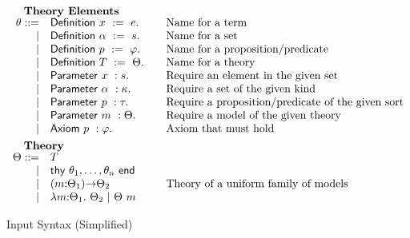 \begin{figure}
\[\begin{array}{rl@{\qquad}l}
		\noalign{\textbf{Theory Elements}}
		\ite ::=
		     & \iDefinition{\ix}{\ie}&\mbox{Name for a term}\\
		   | & \iDefinition{\iS}{\is}&\mbox{Name for a set}\\
		   | & \iDefinition{\iP}{\ip}&\mbox{Name for a proposition/predicate}\\
		   | & \iDefinition{\iTH}{\ith}&\mbox{Name for a theory}\\
		   | & \iParameter{\ix}{\is}&\mbox{Require an element in the given set}\\
		   | & \iParameter{\iS}{\ik}&\mbox{Require a set of the given kind}\\
		   | & \iParameter{\iP}{\ipt}&\mbox{Require a proposition/predicate of the given sort}\\
		   | & \iParameter{\iM}{\ith}&\mbox{Require a model of the given theory}\\
		   | & \iAxiom{\iP}{\ip}&\mbox{Axiom that must hold}\\[5pt]

  		\noalign{\textbf{Theory}}
		\ith ::= 
		     & \iTH\\
		   	| & \ithy{\ite_1,\ldots,\ite_n}\\
		 	| & \idarrow{\iM}{\ith_1}{\ith_2} &\mbox{Theory of a uniform family of models}\\
		  	| & \ilambda{\iM}{\ith_1}{\ith_2}\ |\ 
		      \iapp{\ith}{\iM}\\
	\end{array}
	\]
	\label{fig:input}
	\caption{Input Syntax (Simplified)}
\end{figure}





